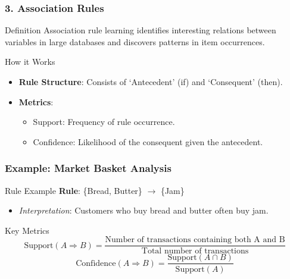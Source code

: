 \documentclass[aspectratio=169]{beamer}
\begin{document}
\begin{frame}[fragile]
    \frametitle{3. Association Rules}
    \begin{block}{Definition}
        Association rule learning identifies interesting relations between variables in large databases and discovers patterns in item occurrences.
    \end{block}

    \begin{block}{How it Works}
        \begin{itemize}
            \item \textbf{Rule Structure}: Consists of ‘Antecedent’ (if) and ‘Consequent’ (then).
            \item \textbf{Metrics}:
            \begin{itemize}
                \item Support: Frequency of rule occurrence.
                \item Confidence: Likelihood of the consequent given the antecedent.
            \end{itemize}
        \end{itemize}
    \end{block}
\end{frame}

\begin{frame}[fragile]
    \frametitle{Example: Market Basket Analysis}
    \begin{block}{Rule Example}
        \textbf{Rule}: \{Bread, Butter\} \(\rightarrow\) \{Jam\}
        \begin{itemize}
            \item \textit{Interpretation}: Customers who buy bread and butter often buy jam.
        \end{itemize}
    \end{block}
    
    \begin{block}{Key Metrics}
        \begin{equation}
            \text{Support}(A \Rightarrow B) = \frac{\text{Number of transactions containing both A and B}}{\text{Total number of transactions}}
        \end{equation}
        \begin{equation}
            \text{Confidence}(A \Rightarrow B) = \frac{\text{Support}(A \cap B)}{\text{Support}(A)}
        \end{equation}
    \end{block}
\end{frame}
\end{document}
